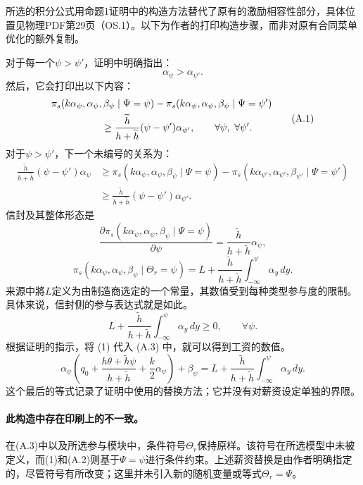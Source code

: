 \documentclass{article}
\begin{document}
所选的积分公式用命题1证明中的构造方法替代了原有的激励相容性部分，具体位置见物理PDF第29页（OS.1）。以下为作者的打印构造步骤，而非对原有合同菜单优化的额外复制。

对于每一个\(\psi>\psi'\)，证明中明确指出：
\[
\alpha_\psi>\alpha_{\psi'}.
\]
然后，它会打印出以下内容：
\begin{equation}
\begin{aligned}
&\pi_s(k\alpha_\psi,\alpha_\psi,\beta_\psi\mid\Psi=\psi)
-\pi_s(k\alpha_\psi,\alpha_\psi,\beta_\psi\mid\Psi=\psi')\\
&\hspace{18mm}\geq
\frac{\widetilde h}{h+\widetilde h}(\psi-\psi')\alpha_{\psi'},
\qquad\forall\psi,\ \forall\psi'.
\end{aligned}
\tag{A.1}
\end{equation}
对于\(\psi>\psi'\)，下一个未编号的关系为：
\[
\begin{aligned}
\frac{\widetilde h}{h+\widetilde h}(\psi-\psi')\alpha_\psi
&\geq
\pi_s(k\alpha_\psi,\alpha_\psi,\beta_\psi\mid\Psi=\psi)
-\pi_s(k\alpha_{\psi'},\alpha_{\psi'},\beta_{\psi'}\mid\Psi=\psi')\\
&\geq
\frac{\widetilde h}{h+\widetilde h}(\psi-\psi')\alpha_{\psi'}.
\end{aligned}
\]
信封及其整体形态是
\begin{equation}
\frac{\partial\pi_s(k\alpha_\psi,\alpha_\psi,\beta_\psi\mid\Psi=\psi)}{\partial\psi}
=\frac{\widetilde h}{h+\widetilde h}\alpha_\psi,
\tag{A.2}
\end{equation}
\begin{equation}
\pi_s(k\alpha_\psi,\alpha_\psi,\beta_\psi\mid\Theta_r=\psi)
=L+\frac{\widetilde h}{h+\widetilde h}\int_{-\infty}^{\psi}\alpha_y\,dy.
\tag{A.3}
\end{equation}
来源中將\(L\)定义为由制造商选定的一个常量，其数值受到每种类型参与度的限制。具体来说，信封侧的参与表达式就是如此。
\[
L+\frac{\widetilde h}{h+\widetilde h}\int_{-\infty}^{\psi}\alpha_y\,dy\geq0,
\qquad\forall\psi.
\]
根据证明的指示，将 (1) 代入 (A.3) 中，就可以得到工资的数值。
\[
\alpha_\psi\left(q_0+\frac{h\theta+\widetilde h\psi}{h+\widetilde h}
+\frac{k}{2}\alpha_\psi\right)+\beta_\psi
=L+\frac{\widetilde h}{h+\widetilde h}\int_{-\infty}^{\psi}\alpha_y\,dy.
\]
这个最后的等式记录了证明中使用的替换方法；它并没有对薪资设定单独的界限。

\paragraph{此构造中存在印刷上的不一致。}
在(A.3)中以及所选参与模块中，条件符号\(\Theta_r\)保持原样。该符号在所选模型中未被定义，而(1)和(A.2)则基于\(\Psi=\psi\)进行条件约束。上述薪资替换是由作者明确指定的，尽管符号有所改变；这里并未引入新的随机变量或等式\(\Theta_r=\Psi\)。
\end{document}
